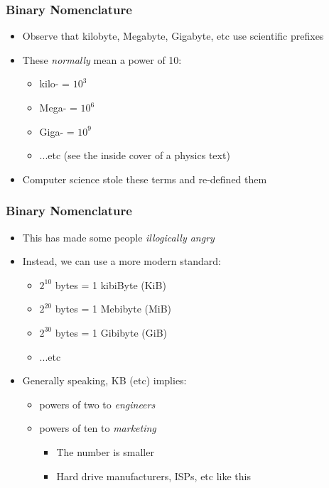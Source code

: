 \documentclass[14pt]{beamer}
\begin{document}
\begin{frame}
\frametitle{Binary Nomenclature}
\begin{itemize}
\item Observe that kilobyte, Megabyte, Gigabyte, etc use scientific prefixes
\item These \textit{normally} mean a power of 10:
	\begin{itemize}
		\item kilo- = $10^3$
		\item Mega- = $10^6$
		\item Giga- = $10^9$
		\item ...etc (see the inside cover of a physics text)
	\end{itemize}
\item Computer science stole these terms and re-defined them

\end{itemize}
\end{frame}

\begin{frame}
\frametitle{Binary Nomenclature}
\begin{itemize}
\item This has made some people \textit{illogically angry}
\item Instead, we can use a more modern standard:
	\begin{itemize}
		\item $2^{10}$ bytes = 1 kibiByte (KiB)
		\item $2^{20}$ bytes = 1 Mebibyte (MiB)
		\item $2^{30}$ bytes = 1 Gibibyte (GiB)
		\item ...etc
	\end{itemize}
\item Generally speaking, KB (etc) implies:
	\begin{itemize}
		\item powers of two to \textit{engineers}
		\item powers of ten to \textit{marketing}
			\begin{itemize}
				\item The number is smaller
				\item Hard drive manufacturers, ISPs, etc like this
			\end{itemize}
	\end{itemize}
\end{itemize}
\end{frame}
\end{document}
